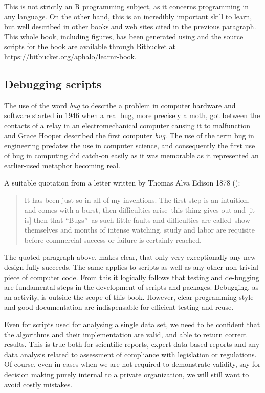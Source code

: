 \documentclass[krantz2]{krantz}\usepackage{knitr}%
\begin{document}
This is not strictly an R programming subject, as it concerns programming in any language. On the other hand, this is an incredibly important skill to learn, but well described in other books and web sites cited in the previous paragraph. This whole book, including figures, has been generated using  and the source scripts for the book are available through Bitbucket at \url{https://bitbucket.org/aphalo/learnr-book}.

\subsection{Debugging scripts}\label{sec:script:debug}

The use of the word \emph{bug} to describe a problem in computer hardware and software started in 1946 when a real bug, more precisely a moth, got between the contacts of a relay in an electromechanical computer causing it to malfunction and Grace Hooper described the first computer \emph{bug}. The use of the term bug in engineering predates the use in computer science, and consequently the first use of bug in computing did catch-on easily as it was memorable as it represented an earlier-used metaphor becoming real.

A suitable quotation from a letter written by Thomas Alva Edison 1878 (\autocite{Hughes2004}):
\begin{quote}
  It has been just so in all of my inventions. The first step is an intuition, and comes with a burst, then difficulties arise--this thing gives out and [it is] then that ``Bugs''--as such little faults and difficulties are called--show themselves and months of intense watching, study and labor are requisite before commercial success or failure is certainly reached.
\end{quote}

The quoted paragraph above, makes clear, that only very exceptionally any new design fully succeeds. The same applies to \Rlang scripts as well as any other non-trivial piece of computer code. From this it logically follows that testing and de-bugging are fundamental steps in the development of \Rlang scripts and packages. Debugging, as an activity, is outside the scope of this book. However, clear programming style and good documentation are indispensable for efficient testing and reuse.

Even for scripts used for analysing a single data set, we need to be confident that the algorithms and their implementation are valid, and able to return correct results. This is true both for scientific reports, expert data-based reports and any data analysis related to assessment of compliance with legislation or regulations. Of course, even in cases when we are not required to demonstrate validity, say for decision making purely internal to a private organization, we will still want to avoid costly mistakes.
\end{document}
